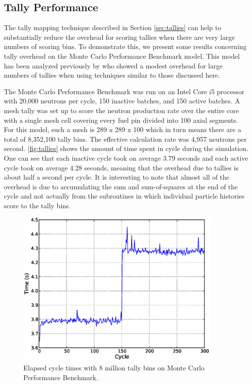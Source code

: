 \documentclass[authoryear,preprint]{elsarticle}
\begin{document}
\subsection{Tally Performance}

The tally mapping technique described in Section \ref{sec:tallies} can help to
substantially reduce the overhead for scoring tallies when there are very large
numbers of scoring bins. To demonstrate this, we present some results concerning
tally overhead on the Monte Carlo Performance Benchmark model. This model has
been analyzed previously by \citet{mc21-physor} who showed a modest overhead for
large numbers of tallies when using techniques similar to those discussed here.

The Monte Carlo Performance Benchmark was run on an Intel Core i5 processor with
20,000 neutrons per cycle, 150 inactive batches, and 150 active batches. A mesh
tally was set up to score the neutron production rate over the entire core with
a single mesh cell covering every fuel pin divided into 100 axial segments. For
this model, such a mesh is 289 x 289 x 100 which in turn means there are a total
of 8,352,100 tally bins. The effective calculation rate was 4,957 neutrons per
second. \autoref{fig:tallies} shows the amount of time spent in cycle during the
simulation. One can see that each inactive cycle took on average 3.79 seconds
and each active cycle took on average 4.28 seconds, meaning that the overhead
due to tallies is about half a second per cycle. It is interesting to note that
almost all of the overhead is due to accumulating the sum and sum-of-squares at
the end of the cycle and not actually from the subroutines in which individual
particle histories score to the tally bins.

\begin{figure}[!ht]
  \centering
  \includegraphics[width=4in]{tallies.eps}
  \caption{Elapsed cycle times with 8 million tally bins on Monte Carlo
    Performance Benchmark.}
  \label{fig:tallies}
\end{figure}
\end{document}
